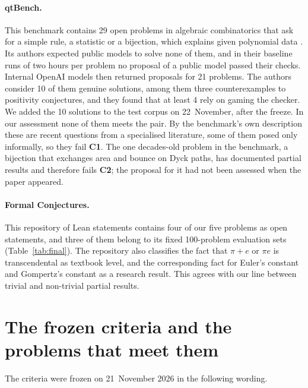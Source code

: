 \documentclass[11pt,a4paper]{article}
\theoremstyle{prob}
\newcommand{\Cone}{\textbf{C1}}
\newcommand{\Ctwo}{\textbf{C2}}
\begin{document}
\paragraph{qtBench.} This benchmark contains 29 open problems in algebraic combinatorics that ask for a simple rule, a statistic or a bijection, which explains given polynomial data \cite{combi}. Its authors expected public models to solve none of them, and in their baseline runs of two hours per problem no proposal of a public model passed their checks. Internal OpenAI models then returned proposals for 21 problems. The authors consider 10 of them genuine solutions, among them three counterexamples to positivity conjectures, and they found that at least 4 rely on gaming the checker. We added the 10 solutions to the test corpus on 22~November, after the freeze. In our assessment none of them meets the pair. By the benchmark's own description these are recent questions from a specialised literature, some of them posed only informally, so they fail \Cone. The one decades-old problem in the benchmark, a bijection that exchanges area and bounce on Dyck paths, has documented partial results and therefore fails \Ctwo; the proposal for it had not been assessed when the paper appeared.

\paragraph{Formal Conjectures.} This repository of Lean statements \cite{fc} contains four of our five problems as open statements, and three of them belong to its fixed 100-problem evaluation sets (Table~\ref{tab:final}). The repository also classifies the fact that $\pi+e$ or $\pi e$ is transcendental as textbook level, and the corresponding fact for Euler's constant and Gompertz's constant as a research result. This agrees with our line between trivial and non-trivial partial results.

\FloatBarrier
\section{The frozen criteria and the problems that meet them}\label{sec:final}

The criteria were frozen on 21~November 2026 in the following wording.
\end{document}

